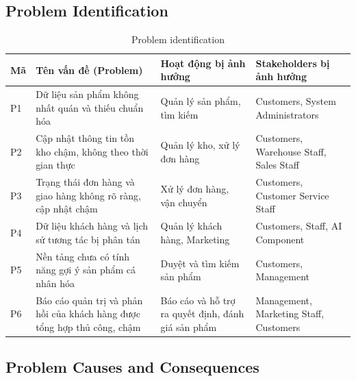 \documentclass[12pt,a4paper,oneside]{report}
\begin{document}
\subsection{Problem Identification}

\begin{longtable}{p{1.2cm}p{5cm}p{5cm}p{4.8cm}}
\caption{Problem identification}\\
\toprule
\textbf{Mã} & \textbf{Tên vấn đề (Problem)} & \textbf{Hoạt động bị ảnh hưởng} & \textbf{Stakeholders bị ảnh hưởng} \\
\midrule
\endhead
\bottomrule
\endlastfoot
P1 & Dữ liệu sản phẩm không nhất quán và thiếu chuẩn hóa & Quản lý sản phẩm, tìm kiếm & Customers, System Administrators \\
P2 & Cập nhật thông tin tồn kho chậm, không theo thời gian thực & Quản lý kho, xử lý đơn hàng & Customers, Warehouse Staff, Sales Staff \\
P3 & Trạng thái đơn hàng và giao hàng không rõ ràng, cập nhật chậm & Xử lý đơn hàng, vận chuyển & Customers, Customer Service Staff \\
P4 & Dữ liệu khách hàng và lịch sử tương tác bị phân tán & Quản lý khách hàng, Marketing & Customers, Staff, AI Component \\
P5 & Nền tảng chưa có tính năng gợi ý sản phẩm cá nhân hóa & Duyệt và tìm kiếm sản phẩm & Customers, Management \\
P6 & Báo cáo quản trị và phản hồi của khách hàng được tổng hợp thủ công, chậm & Báo cáo và hỗ trợ ra quyết định, đánh giá sản phẩm & Management, Marketing Staff, Customers \\
\end{longtable}

\subsection{Problem Causes and Consequences}
\end{document}
